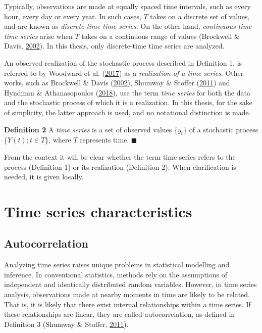 \documentclass[12pt,oneside]{reedthesis}
\begin{document}
Typically, observations are made at equally spaced time intervals, such
as every hour, every day or every year. In such cases, \(T\) takes on a
discrete set of values, and are known as \emph{discrete-time time
series}. On the other hand, \emph{continuous-time time series} arise
when \(T\) takes on a continuous range of values (Brockwell \& Davis,
\protect\hyperlink{ref-brockwell2002}{2002}). In this thesis, only
discrete-time time series are analyzed.

An observed realization of the stochastic process described in
Definition 1, is referred to by Woodward et al.
(\protect\hyperlink{ref-woodward2017}{2017}) as a \emph{realization of a
time series}. Other works, such as Brockwell \& Davis
(\protect\hyperlink{ref-brockwell2002}{2002}), Shumway \& Stoffer
(\protect\hyperlink{ref-shumway2011}{2011}) and Hyndman \&
Athanasopoulos (\protect\hyperlink{ref-hyndman2018fpp}{2018}), use the
term \emph{time series} for both the data and the stochastic process of
which it is a realization. In this thesis, for the sake of simplicity,
the latter approach is used, and no notational distinction is made.

\textbf{Definition 2} A \emph{time series} is a set of observed values
\{\(y_{t}\)\} of a stochastic process \{\(Y(t); t \in T\)\}, where \(T\)
represents time. \(\blacksquare\)

From the context it will be clear whether the term time series refers to
the process (Definition 1) or its realization (Definition 2). When
clarification is needed, it is given locally.

\section{Time series characteristics}\label{time-series-characteristics}

\subsection{Autocorrelation}\label{twotwoone}

Analyzing time series raises unique problems in statistical modelling
and inference. In conventional statistics, methods rely on the
assumptions of independent and identically distributed random variables.
However, in time series analysis, observations made at nearby moments in
time are likely to be related. That is, it is likely that there exist
internal relationships within a time series. If these relationships are
linear, they are called autocorrelation, as defined in Definition 3
(Shumway \& Stoffer, \protect\hyperlink{ref-shumway2011}{2011}).
\end{document}
